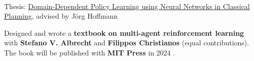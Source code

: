 \documentclass[]{lukas-cv-openfont}
\begin{document}
\noindent
{}
\\
\begin{tightitemize}{1.7em}
    \item Thesis: \href{https://www.lukaschaefer.com/assets/files/bsc_thesis.pdf}{Domain-Dependent Policy Learning using Neural Networks in Classical Planning}, advised by J\"org Hoffmann
\end{tightitemize}

\largesectionsep



\noindent
{}

\vspace{-0.5em}
\begin{flushleft}
    Designed and wrote a \textbf{textbook on multi-agent reinforcement learning} with \textbf{Stefano V. Albrecht} and \textbf{Filippos Christianos} (equal contributions). The book will be published with \textbf{MIT Press} in 2024 \cite{albrecht2024multi}.
\end{flushleft}
\sectionsep
\end{document}
